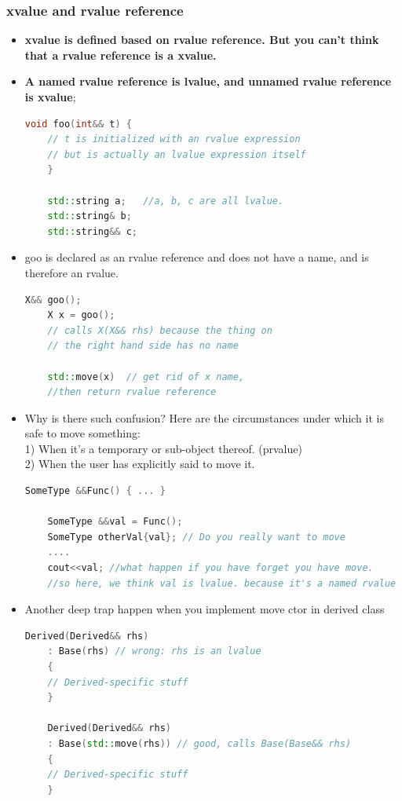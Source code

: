 \documentclass[a4paper,12pt,twoside]{book}
\begin{document}
\subsubsection{xvalue and rvalue reference}

\begin{itemize}
	\item \textbf{xvalue is defined based on rvalue reference. But you can't think that a rvalue reference is a xvalue. }
	
	\item \textbf{A named rvalue reference is lvalue, and unnamed rvalue reference is xvalue};
	
	\begin{lstlisting}[frame=single, language=c++,mathescape=true]
	void foo(int&& t) {
	// t is initialized with an rvalue expression
	// but is actually an lvalue expression itself
	}
	
	std::string a;   //a, b, c are all lvalue.
	std::string& b;
	std::string&& c;
	\end{lstlisting}
	
	
	\item goo is declared as an rvalue reference and does not have a name, and is therefore an rvalue.
	\begin{lstlisting}[frame=single, language=c++,mathescape=true]
	X&& goo();
	X x = goo();
	// calls X(X&& rhs) because the thing on
	// the right hand side has no name
	
	std::move(x)  // get rid of x name,
	//then return rvalue reference
	\end{lstlisting}
	
	\item Why is there such confusion? Here are the circumstances under which it is safe to move something:\\
	1) When it's a temporary or sub-object thereof. (prvalue) \\
	2) When the user has explicitly said to move it.
	\begin{lstlisting}[frame=single, language=c++]
	SomeType &&Func() { ... }
	
	SomeType &&val = Func();
	SomeType otherVal{val}; // Do you really want to move 
	....
	cout<<val; //what happen if you have forget you have move.
	//so here, we think val is lvalue. because it's a named rvalue reference.
	\end{lstlisting}
	
	\item Another deep trap happen when you implement move ctor in derived class
	\begin{lstlisting}[frame=single, language=c++]
	Derived(Derived&& rhs) 
	: Base(rhs) // wrong: rhs is an lvalue
	{
	// Derived-specific stuff
	}
	
	Derived(Derived&& rhs) 
	: Base(std::move(rhs)) // good, calls Base(Base&& rhs)
	{
	// Derived-specific stuff
	}
	\end{lstlisting}
	
\end{itemize}
\end{document}
